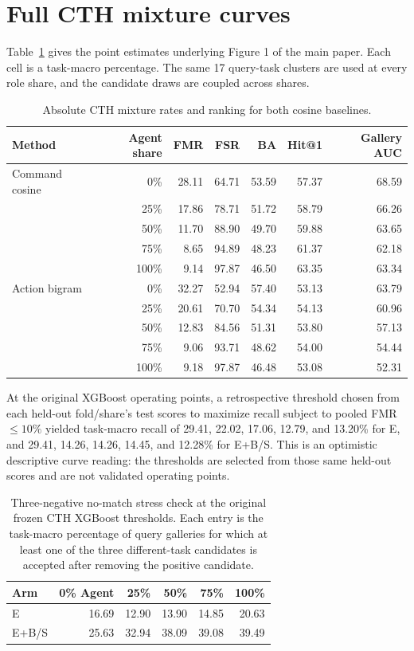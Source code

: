 \documentclass[10pt]{article}
\begin{document}
\section{Full CTH mixture curves}
Table~\ref{tab:mixture-full} gives the point estimates underlying Figure 1 of the main paper. Each cell is a task-macro percentage. The same 17 query-task clusters are used at every role share, and the candidate draws are coupled across shares.

\begin{table}[ht]
\centering\footnotesize
\caption{Absolute CTH mixture rates and ranking for both cosine baselines.}
\label{tab:mixture-full}
\begin{tabular}{@{}lrrrrrr@{}}
\toprule Method & Agent share & FMR & FSR & BA & Hit@1 & Gallery AUC \\
\midrule
Command cosine & 0\% & 28.11 & 64.71 & 53.59 & 57.37 & 68.59 \\
& 25\% & 17.86 & 78.71 & 51.72 & 58.79 & 66.26 \\
& 50\% & 11.70 & 88.90 & 49.70 & 59.88 & 63.65 \\
& 75\% & 8.65 & 94.89 & 48.23 & 61.37 & 62.18 \\
& 100\% & 9.14 & 97.87 & 46.50 & 63.35 & 63.34 \\
\midrule
Action bigram & 0\% & 32.27 & 52.94 & 57.40 & 53.13 & 63.79 \\
& 25\% & 20.61 & 70.70 & 54.34 & 54.13 & 60.96 \\
& 50\% & 12.83 & 84.56 & 51.31 & 53.80 & 57.13 \\
& 75\% & 9.06 & 93.71 & 48.62 & 54.00 & 54.44 \\
& 100\% & 9.18 & 97.87 & 46.48 & 53.08 & 52.31 \\
\bottomrule
\end{tabular}
\end{table}

At the original XGBoost operating points, a retrospective threshold chosen from each held-out fold/share's test scores to maximize recall subject to pooled FMR $\leq10\%$ yielded task-macro recall of 29.41, 22.02, 17.06, 12.79, and 13.20\% for E, and 29.41, 14.26, 14.26, 14.45, and 12.28\% for E+B/S. This is an optimistic descriptive curve reading: the thresholds are selected from those same held-out scores and are not validated operating points.

\begin{table}[ht]
\centering\footnotesize
\caption{Three-negative no-match stress check at the original frozen CTH XGBoost thresholds. Each entry is the task-macro percentage of query galleries for which at least one of the three different-task candidates is accepted after removing the positive candidate.}
\begin{tabular}{@{}lrrrrr@{}}
\toprule Arm & 0\% Agent & 25\% & 50\% & 75\% & 100\% \\
\midrule
E & 16.69 & 12.90 & 13.90 & 14.85 & 20.63 \\
E+B/S & 25.63 & 32.94 & 38.09 & 39.08 & 39.49 \\
\bottomrule
\end{tabular}
\end{table}
\end{document}
